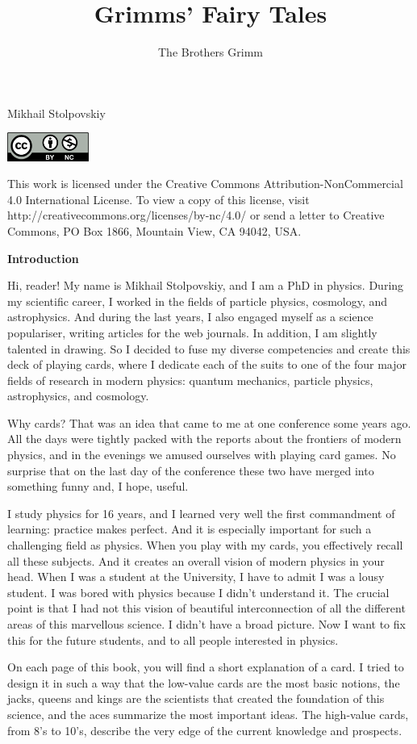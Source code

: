\documentclass[]{bookest}
\title{Grimms' Fairy Tales} %
\author{The Brothers Grimm} %
\begin{document}
\vskip50pt
{

Mikhail Stolpovskiy}
\vskip50pt
\includegraphics[width=0.2\textwidth]{Pics/by-nc.png}

This work is licensed under the Creative Commons Attribution-NonCommercial 4.0 International License. To view a copy of this license, visit http://creativecommons.org/licenses/by-nc/4.0/ or send a letter to Creative Commons, PO Box 1866, Mountain View, CA 94042, USA.
\newpage

{\huge{\textbf{Introduction}}}
\vskip12pt

Hi, reader! My name is Mikhail Stolpovskiy, and I am a PhD in physics. During my scientific career, I worked in the fields of particle physics, cosmology, and astrophysics. And during the last  years, I also engaged myself as a science populariser, writing articles for the web journals. In addition, I am slightly talented in drawing. So I decided to fuse  my diverse competencies and create this deck of playing cards, where I dedicate each of the suits to one of the four major fields of research in modern physics: quantum mechanics, particle physics, astrophysics, and cosmology.

Why cards? That was an idea that came to me at one conference some years ago. All the days were tightly packed with the reports about the frontiers of  modern physics, and in the evenings we amused ourselves with playing card games. No surprise that on the last day of the conference these two have merged into something funny and, I hope, useful.

I study physics for 16 years, and I learned very well the first commandment of learning: practice makes perfect. And it is especially important for such a challenging field as physics. When you play with my cards, you effectively recall all these subjects. And it creates an overall vision of modern physics in your head. When I was a student at the University, I have to admit I was a lousy student. I was bored with physics because I didn't understand it. The crucial point is that I had not this vision of beautiful interconnection of all the different areas of this marvellous science. I didn't have a broad picture. Now I want to fix this for the future students, and to all people interested in physics.

On each page of this book, you will find a short explanation of a card. I tried to design it in such a way that the low-value cards are the most basic notions, the jacks, queens and kings are the scientists that created the foundation of this science, and the aces summarize the most important ideas. The high-value cards, from 8's to 10's, describe the very edge of the current knowledge and prospects.
\end{document}
